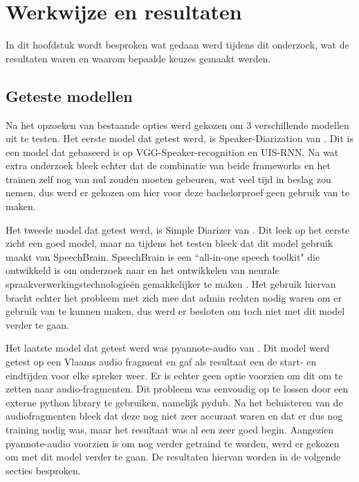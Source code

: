 
\chapter{Werkwijze en resultaten}%
\label{ch:resultaten}
In dit hoofdstuk wordt besproken wat gedaan werd tijdens dit onderzoek, wat de resultaten waren en waarom bepaalde keuzes gemaakt werden.

\section{Geteste modellen}
\label{sec:modellen}
Na het opzoeken van bestaande opties werd gekozen om 3 verschillende modellen uit te testen. Het eerste model dat getest werd, is Speaker-Diarization van \textcite{DongLu}. Dit is een model dat gebaseerd is op VGG-Speaker-recognition en UIS-RNN. Na wat extra onderzoek bleek echter dat de combinatie van beide frameworks en het trainen zelf nog van nul zouden moeten gebeuren, wat veel tijd in beslag zou nemen, dus werd er gekozen om hier voor deze bachelorproef geen gebruik van te maken.

Het tweede model dat getest werd, is Simple Diarizer van \textcite{Chau}. Dit leek op het eerste zicht een goed model, maar na tijdens het testen bleek dat dit model gebruik maakt van SpeechBrain. SpeechBrain is een ``all-in-one speech toolkit" die ontwikkeld is om onderzoek naar en het ontwikkelen van neurale spraakverwerkingstechnologieën gemakkelijker te maken \autocite{speechbrain}. Het gebruik hiervan bracht echter het probleem met zich mee dat admin rechten nodig waren om er gebruik van te kunnen maken, dus werd er besloten om toch niet met dit model verder te gaan.

Het laatste model dat getest werd was pyannote-audio van \textcite{Bredin2024}. Dit model werd getest op een Vlaams audio fragment en gaf als resultaat een de start- en eindtijden voor elke spreker weer. Er is echter geen optie voorzien om dit om te zetten naar audio-fragmenten. Dit probleem was eenvoudig op te lossen door een externe python library te gebruiken, namelijk pydub. Na het beluisteren van de audiofragmenten bleek dat deze nog niet zeer accuraat waren en dat er dus nog training nodig was, maar het resultaat was al een zeer goed begin. Aangezien pyannote-audio voorzien is om nog verder getraind te worden, werd er gekozen om met dit model verder te gaan. De resultaten hiervan worden in de volgende secties besproken.

